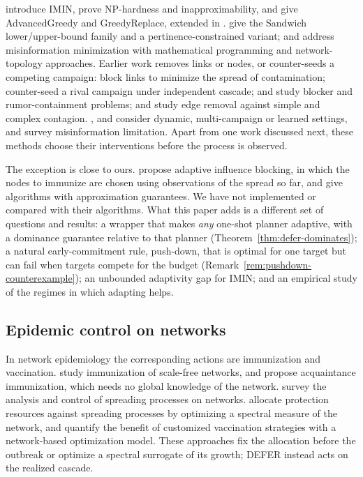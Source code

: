 \documentclass[preprint,11pt]{elsarticle}
\theoremstyle{definition}
\theoremstyle{remark}
\begin{document}
\citet{xie2023} introduce IMIN, prove NP-hardness and inapproximability, and give AdvancedGreedy and GreedyReplace, extended in \citet{xie2024}. \citet{wang2024sandwich} give the Sandwich lower/upper-bound family and \citet{xiang2024} a pertinence-constrained variant; \citet{taninmis2019} and \citet{ghoshal2025} address misinformation minimization with mathematical programming and network-topology approaches. Earlier work removes links or nodes, or counter-seeds a competing campaign: \citet{kimura2008} block links to minimize the spread of contamination; \citet{budak2011} counter-seed a rival campaign under independent cascade; \citet{yan2020} and \citet{yang2020} study blocker and rumor-containment problems; and \citet{kuhlman2013} study edge removal against simple and complex contagion. \citet{wang2016drimux}, \citet{tong2018} and \citet{farajtabar2017} consider dynamic, multi-campaign or learned settings, and \citet{zareie2021} survey misinformation limitation. Apart from one work discussed next, these methods choose their interventions before the process is observed.

The exception is close to ours. \citet{shi2019} propose adaptive influence blocking, in which the nodes to immunize are chosen using observations of the spread so far, and give algorithms with approximation guarantees. We have not implemented or compared with their algorithms. What this paper adds is a different set of questions and results: a wrapper that makes \emph{any} one-shot planner adaptive, with a dominance guarantee relative to that planner (Theorem~\ref{thm:defer-dominates}); a natural early-commitment rule, push-down, that is optimal for one target but can fail when targets compete for the budget (Remark~\ref{rem:pushdown-counterexample}); an unbounded adaptivity gap for IMIN; and an empirical study of the regimes in which adapting helps.

\subsection{Epidemic control on networks}

In network epidemiology the corresponding actions are immunization and vaccination. \citet{pastor2002} study immunization of scale-free networks, and \citet{cohen2003} propose acquaintance immunization, which needs no global knowledge of the network. \citet{nowzari2016} survey the analysis and control of spreading processes on networks. \citet{preciado2014} allocate protection resources against spreading processes by optimizing a spectral measure of the network, and \citet{li2024} quantify the benefit of customized vaccination strategies with a network-based optimization model. These approaches fix the allocation before the outbreak or optimize a spectral surrogate of its growth; DEFER instead acts on the realized cascade.
\end{document}
